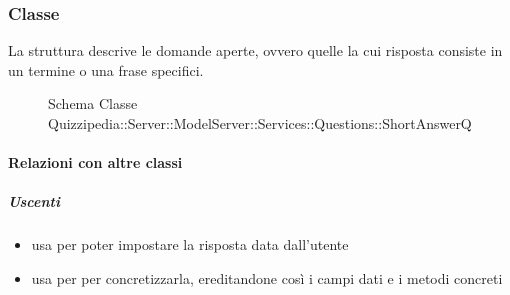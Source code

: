 \subsubsection{Classe }
La struttura descrive le domande aperte, ovvero quelle la cui risposta consiste in un termine o una frase specifici.
\begin{figure}[H]
\centering
\noindent{}
\caption[Schema Classe ShortAnswerQ]{Schema Classe Quizzipedia::Server::ModelServer::Services::Questions::ShortAnswerQ}
\end{figure}
\paragraph{Relazioni con altre classi}
\subparagraph{Uscenti}
\begin{itemize}
\item usa  per poter impostare la risposta data dall'utente
\item usa  per per concretizzarla, ereditandone così i campi dati e i metodi concreti
\end{itemize}
